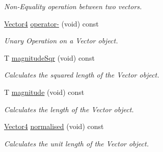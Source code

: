 \begin{DoxyCompactItemize}
\begin{DoxyCompactList}\small\item\em Non-\/\+Equality operation between two vectors. \end{DoxyCompactList}\item 
\hyperlink{classsparky_1_1_vector4}{Vector4} \hyperlink{classsparky_1_1_vector4_ad7a6d99ddf63f0d805ca2feb8d87bb98}{operator-\/} (void) const 
\begin{DoxyCompactList}\small\item\em Unary Operation on a Vector object. \end{DoxyCompactList}\item 
T \hyperlink{classsparky_1_1_vector4_aee94701f67b45f2353b2322518ea780a}{magnitude\+Sqr} (void) const 
\begin{DoxyCompactList}\small\item\em Calculates the squared length of the Vector object. \end{DoxyCompactList}\item 
T \hyperlink{classsparky_1_1_vector4_a7e881896c10506e521765742d1480342}{magnitude} (void) const 
\begin{DoxyCompactList}\small\item\em Calculates the length of the Vector object. \end{DoxyCompactList}\item 
\hyperlink{classsparky_1_1_vector4}{Vector4} \hyperlink{classsparky_1_1_vector4_a9503928a3e08e386ccad76017043e8cf}{normalised} (void) const 
\begin{DoxyCompactList}\small\item\em Calculates the unit length of the Vector object. \end{DoxyCompactList}\end{DoxyCompactItemize}
